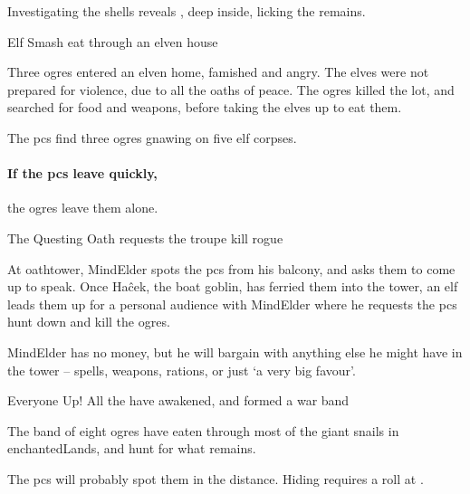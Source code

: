 \begin{multicols}{2}
Investigating the shells reveals , deep inside, licking the remains.

\enchantedOgre

\vspace{-3em}
{Elf Smash}%
{ eat through an elven house}%

\begin{exampletext}
  Three \glspl{ogre} entered an elven home, famished and angry.
  The elves were not prepared for violence, due to all the oaths of peace.
  The \glspl{ogre} killed the lot, and searched for food and \glspl{weapon}, before taking the elves up to eat them.
\end{exampletext}

The \glspl{pc} find three \glspl{ogre} gnawing on five elf corpses.


\paragraph{If the \glspl{pc} leave quickly,}
the \glspl{ogre} leave them alone.

{The Questing Oath}%
{ requests the troupe kill rogue }%

At \gls{oathtower}, \gls{MindElder} spots the \glspl{pc} from his balcony, and asks them to come up to speak.
Once Ha\^{c}ek, the boat goblin, has ferried them into the tower, an elf leads them up for a personal audience with \gls{MindElder} where he requests the \glspl{pc} hunt down and kill the \glspl{ogre}.

\Gls{MindElder} has no money, but he will bargain with anything else he might have in the tower -- \glspl{spell}, \glspl{weapon}, \glspl{ration}, or just `a very big favour'.

{Everyone Up!}%
{All the  have awakened, and formed a war band}%

The band of eight \glspl{ogre} have eaten through most of the giant snails in \gls{enchantedLands}, and hunt for what remains.



The \glspl{pc} will probably spot them in the distance.
Hiding requires a  roll at
\tn.


\end{multicols}
